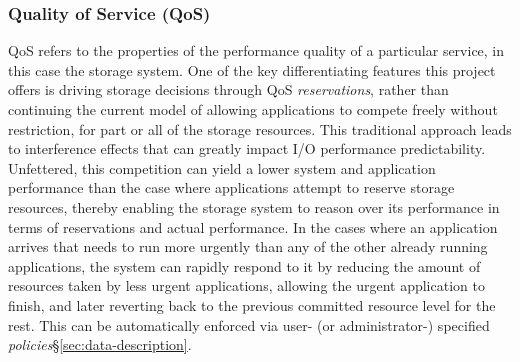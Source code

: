 \subsubsection{Quality of Service (QoS)}
QoS refers to the
properties of the performance quality of a particular service, in
this case the storage system.
One of the key differentiating features this project offers is driving storage
decisions through QoS \emph{reservations}, rather than continuing the current model
of allowing applications to compete freely without restriction, for part or all of the storage
resources. This traditional approach leads to interference effects
\cite{lofstead:2010:io-variability,liu_hotstorage} that can greatly impact I/O performance predictability. 
Unfettered, this competition can yield a lower system and application performance 
than the case where applications attempt to reserve storage resources, thereby enabling the storage system
to reason over its performance in terms of reservations and actual
performance.
In the cases where an application arrives that needs to run more urgently
than any of the other already running applications, the system
can rapidly respond to it by reducing the amount of resources taken 
by less urgent applications, allowing the urgent application to finish,
and later reverting back to the previous committed resource level for the rest.
This can be automatically enforced via user- (or administrator-) specified \textit{policies}\S\ref{sec:data-description}.

